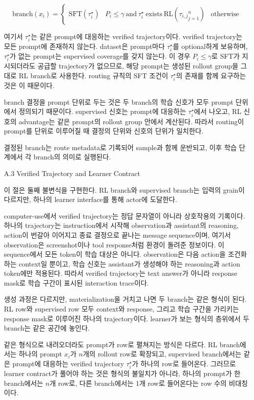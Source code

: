 $$\mathrm{branch}(x_i) = \begin{cases} \mathrm{SFT}(\tau_i^\star) & P_i \le \gamma \ \text{and}\ \tau_i^\star\ \text{exists} \ \mathrm{RL}({\tau_{i,j}}_{j=1}^{n}) & \text{otherwise} \end{cases}$$

여기서 $\tau_i^\star$는 같은 prompt에 대응하는 verified trajectory이다. verified trajectory는 모든 prompt에 존재하지 않는다. dataset은 prompt마다 $\tau_i^\star$를 optional하게 보유하며, $\tau_i^\star$가 없는 prompt는 supervised coverage를 갖지 않는다. 이 경우 $P_i \le \gamma$로 SFT가 지시되더라도 공급할 trajectory가 없으므로, 해당 prompt는 생성된 rollout group을 그대로 RL branch로 사용한다. routing 규칙의 SFT 조건이 $\tau_i^\star$의 존재를 함께 요구하는 것은 이 때문이다.

branch 결정을 prompt 단위로 두는 것은 두 branch의 학습 신호가 모두 prompt 단위에서 정의되기 때문이다. supervised 신호는 prompt에 대응하는 $\tau_i^\star$에서 나오고, RL 신호의 advantage는 같은 prompt의 rollout group 안에서 계산된다. 따라서 routing이 prompt를 단위로 이루어질 때 결정의 단위와 신호의 단위가 일치한다.

결정된 branch는 route metadata로 기록되어 sample과 함께 운반되고, 이후 학습 단계에서 각 branch의 의미로 실행된다.

A.3 Verified Trajectory and Learner Contract


이 절은 둘째 불변식을 구현한다. RL branch와 supervised branch는 입력의 grain이 다르지만, 하나의 learner interface를 통해 actor에 도달한다.

computer-use에서 verified trajectory는 정답 문자열이 아니라 상호작용의 기록이다. 하나의 trajectory는 instruction에서 시작해 observation과 assistant의 reasoning, action이 번갈아 이어지고 종료 결정으로 끝나는 message sequence이며, 여기서 observation은 screenshot이나 tool response처럼 환경이 돌려준 정보이다. 이 sequence에서 모든 token이 학습 대상은 아니다. observation은 다음 action을 조건화하는 context일 뿐이고, 학습 신호는 assistant가 생성해야 하는 reasoning과 action token에만 적용된다. 따라서 verified trajectory는 text answer가 아니라 response mask로 학습 구간이 표시된 interaction trace이다.

생성 과정은 다르지만, materialization을 거치고 나면 두 branch는 같은 형식이 된다. RL row와 supervised row 모두 context와 response, 그리고 학습 구간을 가리키는 response mask로 이루어진 하나의 trajectory이다. learner가 보는 형식의 층위에서 두 branch는 같은 공간에 놓인다.

같은 형식으로 내려오더라도 prompt가 row로 펼쳐지는 방식은 다르다. RL branch에서는 하나의 prompt $x_i$가 $n$개의 rollout row로 확장되고, supervised branch에서는 같은 prompt에 대응하는 verified trajectory $\tau_i^\star$가 하나의 row로 들어온다. 그러므로 learner contract가 풀어야 하는 것은 형식의 불일치가 아니라, 하나의 prompt가 한 branch에서는 $n$개 row로, 다른 branch에서는 1개 row로 들어온다는 row 수의 비대칭이다.

